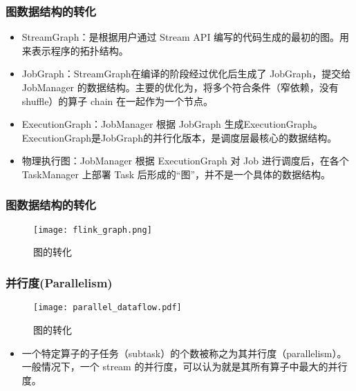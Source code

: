 \documentclass{beamer}
\begin{document}
  \begin{frame}
      \frametitle{图数据结构的转化}

      \begin{center}
      \end{center}

      \begin{itemize}
          \item StreamGraph：是根据用户通过 Stream API 编写的代码生成的最初的图。用来表示程序的拓扑结构。
          \item JobGraph：StreamGraph在编译的阶段经过优化后生成了 JobGraph，提交给 JobManager 的数据结构。主要的优化为，将多个符合条件（窄依赖，没有shuffle）的算子 chain 在一起作为一个节点。
          \item ExecutionGraph：JobManager 根据 JobGraph 生成ExecutionGraph。ExecutionGraph是JobGraph的并行化版本，是调度层最核心的数据结构。
          \item 物理执行图：JobManager 根据 ExecutionGraph 对 Job 进行调度后，在各个TaskManager 上部署 Task 后形成的“图”，并不是一个具体的数据结构。
      \end{itemize}
  
  \end{frame}

  \begin{frame}
      \frametitle{图数据结构的转化}
  
      \begin{figure}
        \centering
        \texttt{[image: flink\_graph.png]}
        \caption{图的转化}
      \end{figure}
  
  \end{frame}

  \begin{frame}
      \frametitle{并行度(Parallelism)}
  
      \begin{figure}
        \centering
        \texttt{[image: parallel\_dataflow.pdf]}
        \caption{图的转化}
      \end{figure}

      \begin{itemize}
          \item 一个特定算子的子任务（subtask）的个数被称之为其并行度（parallelism）。一般情况下，一个 stream 的并行度，可以认为就是其所有算子中最大的并行度。
      \end{itemize}
  
  \end{frame}
\end{document}
